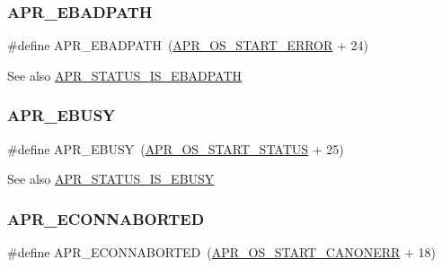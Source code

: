 \subsubsection{\texorpdfstring{A\+P\+R\+\_\+\+E\+B\+A\+D\+P\+A\+TH}{APR\_EBADPATH}}
{\footnotesize\ttfamily \#define A\+P\+R\+\_\+\+E\+B\+A\+D\+P\+A\+TH~(\mbox{\hyperlink{group__apr__errno_ga191894048b7bd0cca3cf0bdff1eb695b}{A\+P\+R\+\_\+\+O\+S\+\_\+\+S\+T\+A\+R\+T\+\_\+\+E\+R\+R\+OR}} + 24)}

\begin{DoxySeeAlso}{See also}
\mbox{\hyperlink{group___a_p_r___s_t_a_t_u_s___i_s_ga0758d7227209e4311c843c752c0dd075}{A\+P\+R\+\_\+\+S\+T\+A\+T\+U\+S\+\_\+\+I\+S\+\_\+\+E\+B\+A\+D\+P\+A\+TH}} 
\end{DoxySeeAlso}
\mbox{\label{group___a_p_r___error_gab6e5bc99dbace4a91d8d0adcbd8fd66b}} 
\subsubsection{\texorpdfstring{A\+P\+R\+\_\+\+E\+B\+U\+SY}{APR\_EBUSY}}
{\footnotesize\ttfamily \#define A\+P\+R\+\_\+\+E\+B\+U\+SY~(\mbox{\hyperlink{group__apr__errno_ga450e1a5734732e092ddaa5b67414f69b}{A\+P\+R\+\_\+\+O\+S\+\_\+\+S\+T\+A\+R\+T\+\_\+\+S\+T\+A\+T\+US}} + 25)}

\begin{DoxySeeAlso}{See also}
\mbox{\hyperlink{group___a_p_r___s_t_a_t_u_s___i_s_gabb92ad7b6ef304132de70e9e5cbaa896}{A\+P\+R\+\_\+\+S\+T\+A\+T\+U\+S\+\_\+\+I\+S\+\_\+\+E\+B\+U\+SY}} 
\end{DoxySeeAlso}
\mbox{\label{group___a_p_r___error_ga9458da18e0ee46a5d37c9cdfdc43efd2}} 
\subsubsection{\texorpdfstring{A\+P\+R\+\_\+\+E\+C\+O\+N\+N\+A\+B\+O\+R\+T\+ED}{APR\_ECONNABORTED}}
{\footnotesize\ttfamily \#define A\+P\+R\+\_\+\+E\+C\+O\+N\+N\+A\+B\+O\+R\+T\+ED~(\mbox{\hyperlink{group__apr__errno_ga7bca957c11b80b31cb54b0d2cbe9e025}{A\+P\+R\+\_\+\+O\+S\+\_\+\+S\+T\+A\+R\+T\+\_\+\+C\+A\+N\+O\+N\+E\+RR}} + 18)}

